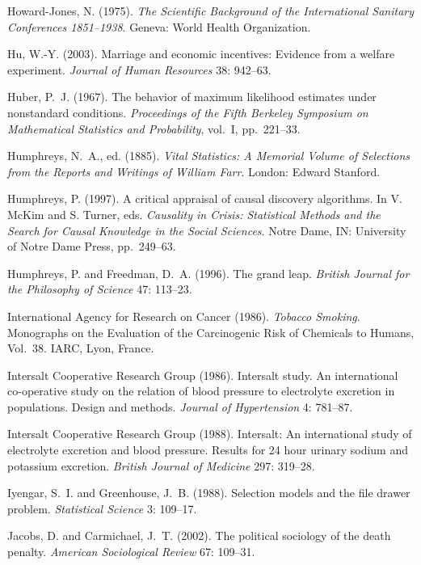 \smallskip\noindent
Howard-Jones, N. (1975).
{\it The Scientific Background of the International Sanitary Conferences 1851--1938\/}.
Geneva: World Health Organization.

\smallskip\noindent
Hu, W.-Y. (2003).
Marriage and economic incentives: Evidence from a welfare experiment.
{\it Journal of Human Resources\/} {38}: 942--63.

\smallskip\noindent
Huber, P.~J. (1967).
The behavior of maximum likelihood estimates under nonstandard conditions.
{\it Proceedings of the Fifth Berkeley Symposium on Mathematical Statistics and Probability\/},
vol.~I, pp.~221--33.

\smallskip\noindent
Humphreys, N.~A., ed. (1885).
{\it Vital Statistics: A Memorial Volume of Selections from
the Reports and Writings of William Farr\/}.
London: Edward Stanford.

\smallskip\noindent
Humphreys, P. (1997).
A critical appraisal of causal discovery algorithms.
In V. McKim and S. Turner, eds.
{\it Causality in Crisis:  Statistical Methods and the Search for Causal Knowledge in the Social Sciences\/}.
Notre Dame, IN: University of Notre Dame Press, pp.~249--63.

\smallskip\noindent
Humphreys, P. and Freedman, D.~A. (1996).
The grand leap.
{\it British Journal for the Philosophy of Science\/} 47: 113--23.

\smallskip\noindent
International Agency for Research on Cancer (1986).
{\it Tobacco Smoking\/}.\break
Monographs on the Evaluation of the Carcinogenic Risk of Chemicals to Humans,
Vol.~38. IARC, Lyon, France.

\smallskip\noindent
Intersalt Cooperative Research Group (1986).
Intersalt study. An international co-operative study on the relation of blood pressure
to electrolyte excretion in populations. Design and methods.
{\it Journal of Hypertension\/} 4: 781--87.

\smallskip\noindent
Intersalt Cooperative Research Group (1988).
Intersalt: An international study of electrolyte excretion and blood pressure.
Results for 24 hour urinary sodium and potassium excretion.
{\it British Journal of Medicine\/} 297: 319--28.

\smallskip\noindent
Iyengar, S.~I. and Greenhouse, J.~B. (1988).
Selection models and the file drawer problem.
{\it Statistical Science\/} 3: 109--17.

\smallskip\noindent
Jacobs, D. and Carmichael, J.~T. (2002).
The political sociology of the death penalty.
{\it American Sociological Review\/} 67: 109--31.

